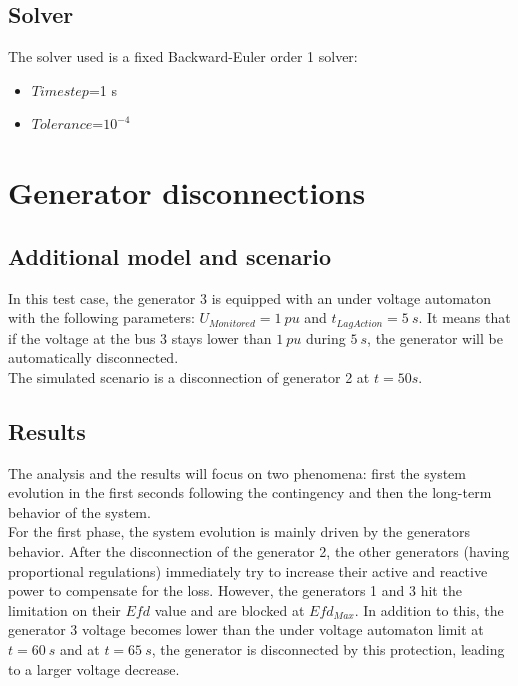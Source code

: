 \documentclass[a4paper, 12pt]{report}
\begin{document}
\subsection{Solver}
The solver used is a fixed Backward-Euler order 1 solver:
\begin{itemize}
\item $Time step$=1 s
\item $Tolerance$=$10^{-4}$
\end{itemize}

\newpage
\section{Generator disconnections}

\subsection{Additional model and scenario}

In this test case, the generator 3 is equipped with an under voltage automaton with the following parameters: $U_{Monitored} = 1 \ pu $ and $t_{LagAction} = 5 \ s$. It means that if the voltage at the bus 3 stays lower than $1 \ pu$ during $5 \ s$, the generator will be automatically disconnected.\\

The simulated scenario is a disconnection of generator 2 at $ t = 50 s$.

\subsection{Results}

The analysis and the results will focus on two phenomena: first the system evolution in the first seconds following the contingency and then the long-term behavior of the system. \\

For the first phase, the system evolution is mainly driven by the generators behavior. After the disconnection of the generator 2, the other generators (having proportional regulations) immediately try to increase their active and reactive power to compensate for the loss. However, the generators 1 and 3 hit the limitation on their $Efd$ value and are blocked at $Efd_{Max}$. In addition to this, the generator 3 voltage becomes lower than the under voltage automaton limit at $t = 60 \ s$ and at $t = 65 \ s$, the generator is disconnected by this protection, leading to a larger voltage decrease.
\end{document}
